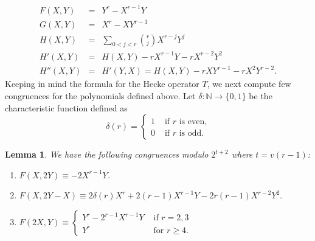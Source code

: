 \documentclass[11pt, reqno]{amsart}
\numberwithin{equation}{section}
\newcommand\N{\mathbb{N}}
\newtheorem{lemma}[thm]{Lemma}
\theoremstyle{definition}
\theoremstyle{remark}
\theoremstyle{definition}
\theoremstyle{remark}
\theoremstyle{remark}
\begin{document}
\begin{eqnarray}
\label{Fdef} F(X,Y) &=& Y^r-X^{r-1}Y
\\
\label{Gdef} G(X,Y) &=& X^r-XY^{r-1}
\\
\label{Hdef} H(X,Y) &=& \displaystyle\sum_{0<j<r}{r \choose j}X^{r-j}Y^{j}\\
\label{H'}H'(X,Y) &=& H(X,Y)-rX^{r-1}Y-rX^{r-2}Y^2\\
\label{H''} H''(X,Y) &=& H'(Y,X)= H(X,Y)-rXY^{r-1}-rX^2Y^{r-2}.
\end{eqnarray}
 Keeping in mind the formula for the Hecke operator $T$, we next compute few congruences for the polynomials defined above. Let 
$\delta:\N \to \{0,1\}$ be the characteristic function defined as
\begin{equation}\label{delta}\delta(r) = \begin{cases}
    1 & \text{ if } r \text{ is even,}\\
    0 & \text{ if } r \text{ is odd.}\end{cases}  \end{equation}
\begin{lemma}\label{F}
 We have the following congruences modulo $2^{t+2}$ where $t=v(r-1)$:
\begin{enumerate}[label=(\alph*)]
\item $F(X,2Y) \equiv -2X^{r-1}Y$.\\
\item
    $F(X,2Y-X) 
    \equiv 2\delta(r)X^{r}+2(r-1)X^{r-1}Y- 2r(r-1)X^{r-2}Y^{2}.$ \label{Fb}
     \\
\item $F(2X,Y) \equiv
\begin{cases}
Y^{r} - 2^{r-1}X^{r-1}Y &\text{ if } r=2,3 \\
Y^{r} &\text{ for } r\geq 4.
\end{cases} \label{Fc}$
\end{enumerate} 
 \end{lemma}
\end{document}
